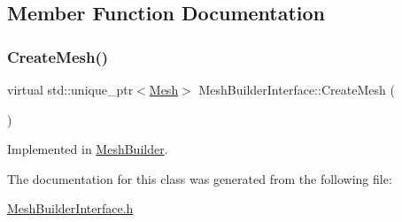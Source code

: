 \subsection{Member Function Documentation}
\mbox{\label{class_mesh_builder_interface_a2d9b31466ef198b2029438970af81323}} 
\subsubsection{\texorpdfstring{CreateMesh()}{CreateMesh()}}
{\footnotesize\ttfamily virtual std\+::unique\+\_\+ptr$<$\mbox{\hyperlink{class_mesh}{Mesh}}$>$ Mesh\+Builder\+Interface\+::\+Create\+Mesh (\begin{DoxyParamCaption}\item[{\mbox{\hyperlink{_abstract_factory_2_abstract_factory_2builder_2_mesh_builder_8h_ad6436347ddb93aed826a19081b53dd61}{M\+E\+S\+H\+T\+Y\+PE}}}]{ }\end{DoxyParamCaption})\hspace{0.3cm}{\ttfamily [pure virtual]}}



Implemented in \mbox{\hyperlink{class_mesh_builder_a51d89fe601df06e63112c70416ac03dc}{Mesh\+Builder}}.



The documentation for this class was generated from the following file\+:\begin{DoxyCompactItemize}
\item 
\mbox{\hyperlink{_mesh_builder_interface_8h}{Mesh\+Builder\+Interface.\+h}}\end{DoxyCompactItemize}
